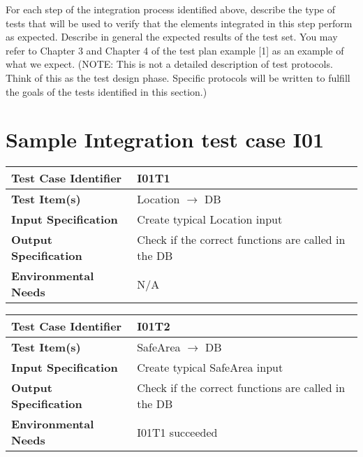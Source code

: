 For each step of the integration process identified above, describe the type of tests that will be used to verify that the elements integrated in this step perform as expected. Describe in general the expected results of the test set. You may refer to Chapter 3 and Chapter 4 of the test plan example [1] as an example of what we expect.
(NOTE: This is not a detailed description of test protocols. Think of this as the test design phase. Specific protocols will be written to fulfill the goals of the tests identified in this section.)

\section{Sample Integration test case I01}\label{I01}
\begin{center}
	\vspace{0.6cm}
	\begin{tabular}{|l|l|}
		\hline
		\textbf{Test Case Identifier} & I01T1 \bigstrut \\\hline
		\textbf{Test Item(s)} & Location \ensuremath{\rightarrow} DB \bigstrut \\\hline
		\textbf{Input Specification} & Create typical Location input \bigstrut \\\hline
		\textbf{Output Specification} & Check if the correct functions are called in the DB \bigstrut \\\hline
		\textbf{Environmental Needs} & N/A \bigstrut \\\hline
	\end{tabular}
\end{center}

\begin{center}
	\vspace{0.6cm}
	\begin{tabular}{|l|l|}
		\hline
		\textbf{Test Case Identifier} & I01T2 \bigstrut \\\hline
		\textbf{Test Item(s)} & SafeArea \ensuremath{\rightarrow} DB \bigstrut \\\hline
		\textbf{Input Specification} & Create typical SafeArea input \bigstrut \\\hline
		\textbf{Output Specification} & Check if the correct functions are called in the DB \bigstrut \\\hline
		\textbf{Environmental Needs} & I01T1 succeeded\bigstrut \\\hline
	\end{tabular}
\end{center}

